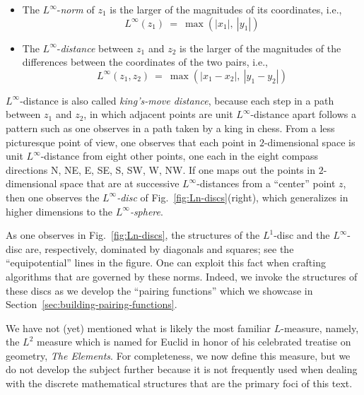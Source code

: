  
\begin{itemize}
\item
The $L^\infty$-{\it norm}  of $z_1$ is
the larger of the magnitudes of its coordinates, i.e.,
\[ L^\infty(z_1) \ = \ \max(|x_1|, \ |y_1|)  \]  

\item
The $L^\infty$-{\it distance} 
between $z_1$ and $z_2$ is the larger of the magnitudes of the
differences between the coordinates of the two pairs, i.e.,
\[ L^\infty(z_1, z_2) \ = \ \max(|x_1 - x_2|, \  |y_1 - y_2|) \]
\end{itemize}
$L^\infty$-distance is also called {\it king's-move distance},
 because each step in a path between $z_1$
and $z_2$, in which adjacent points are unit $L^\infty$-distance apart
follows a pattern such as one observes in a path taken by a king in
chess.  From a less picturesque point of view, one observes that each
point in $2$-dimensional space is unit $L^\infty$-distance from eight
other points, one each in the eight compass directions N, NE, E, SE,
S, SW, W, NW.  If one maps out the points in $2$-dimensional space
that are at successive $L^\infty$-distances from a ``center'' point
$z$, then one observes the {\it $L^\infty$-disc} of
Fig.~\ref{fig:Ln-discs}(right),  which
generalizes in higher dimensions to the
{\it $L^\infty$-sphere}. 

\smallskip

As one observes in Fig.~\ref{fig:Ln-discs}, the structures of the
$L^1$-disc and the $L^\infty$-disc are, respectively, dominated by
diagonals and squares; see the ``equipotential'' lines in the figure.
One can exploit this fact when crafting algorithms that are governed
by these norms.  Indeed, we invoke the structures of these discs as we
develop the ``pairing functions'' which we showcase in
Section~\ref{sec:building-pairing-functions}.

\bigskip

We have not (yet) mentioned what is likely the most familiar
$L$-measure, namely, the $L^2$ measure which is named for Euclid in
honor of his celebrated treatise on geometry, {\it The Elements}.
 For completeness, we now define this
measure, but we do not develop the subject further because it is not
frequently used when dealing with the discrete mathematical structures
that are the primary foci of this text.

